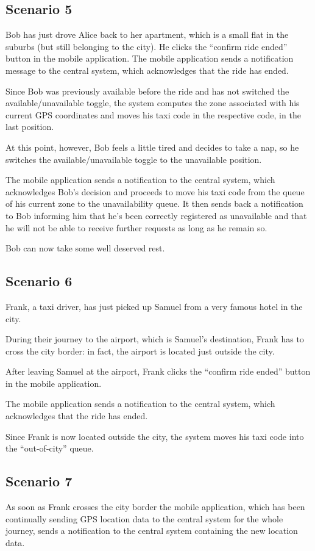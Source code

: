 \subsection{Scenario 5}
Bob has just drove Alice back to her apartment, which is a small flat in the suburbs (but still belonging to the city). He clicks the “confirm ride ended” button in the mobile application. The mobile application sends a notification message to the central system, which acknowledges that the ride has ended.

Since Bob was previously available before the ride and has not switched the available/unavailable toggle, the system computes the zone associated with his current GPS coordinates and moves his taxi code in the respective code, in the last position.

At this point, however, Bob feels a little tired and decides to take a nap, so he switches the available/unavailable toggle to the unavailable position.

The mobile application sends a notification to the central system, which acknowledges Bob’s decision and proceeds to move his taxi code from the queue of his current zone to the unavailability queue. It then sends back a notification to Bob informing him that he’s been correctly registered as unavailable and that he will not be able to receive further requests as long as he remain so.

Bob can now take some well deserved rest.


\subsection{Scenario 6}
Frank, a taxi driver, has just picked up Samuel from a very famous hotel in the city.

During their journey to the airport, which is Samuel’s destination, Frank has to cross the city border: in fact, the airport is located just outside the city.

After leaving Samuel at the airport, Frank clicks the “confirm ride ended” button in the mobile application.

The mobile application sends a notification to the central system, which acknowledges that the ride has ended.

Since Frank is now located outside the city, the system moves his taxi code into the “out-of-city” queue.


\subsection{Scenario 7}
As soon as Frank crosses the city border the mobile application, which has been continually sending GPS location data to the central system for the whole journey, sends a notification to the central system containing the new location data.

